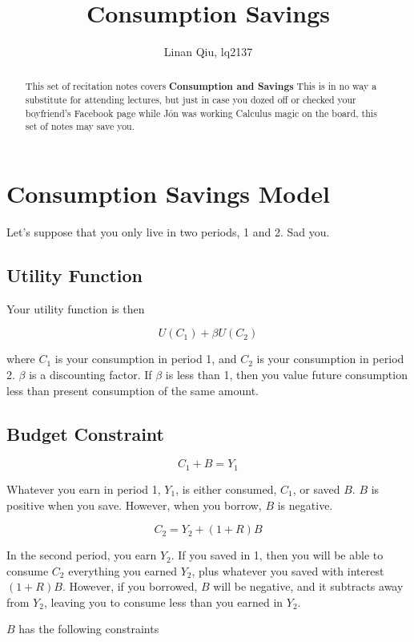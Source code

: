 \documentclass[11pt]{scrartcl}
\title{Consumption Savings}
\author{Linan Qiu, lq2137}
\newcommand{\jon}{Jón }
\begin{document}
\maketitle

\begin{abstract}
This set of recitation notes covers \textbf{Consumption and Savings} This is in no way a substitute for attending lectures, but just in case you dozed off or checked your boyfriend's Facebook page while \jon was working Calculus magic on the board, this set of notes may save you.
\end{abstract}

\section{Consumption Savings Model}

Let's suppose that you only live in two periods, 1 and 2. Sad you.

\subsection{Utility Function}

Your utility function is then

\[ U(C_1) + \beta U(C_2)\]

where $C_1$ is your consumption in period 1, and $C_2$ is your consumption in period 2. $\beta$ is a discounting factor. If $\beta$ is less than 1, then you value future consumption less than present consumption of the same amount.

\subsection{Budget Constraint}

\[C_1 + B = Y_1\]

Whatever you earn in period 1, $Y_1$, is either consumed, $C_1$, or saved $B$. $B$ is positive when you save. However, when you borrow, $B$ is negative.

\[C_2 = Y_2 + (1+R)B \]

In the second period, you earn $Y_2$. If you saved in 1, then you will be able to consume $C_2$ everything you earned $Y_2$, plus whatever you saved with interest $(1+R)B$. However, if you borrowed, $B$ will be negative, and it subtracts away from $Y_2$, leaving you to consume less than you earned in $Y_2$.

$B$ has the following constraints
\end{document}
